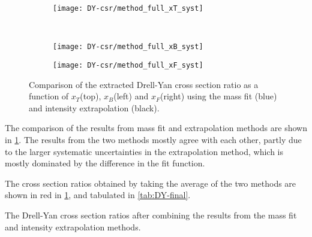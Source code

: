 \documentclass[../main.tex]{subfiles}
\begin{document}
\begin{figure}[h!]
	\centering
	\begin{subfigure}{0.6\linewidth}
		\texttt{[image: DY-csr/method\_full\_xT\_syst]}
	\end{subfigure}\\
	\begin{subfigure}{0.45\linewidth}
		\texttt{[image: DY-csr/method\_full\_xB\_syst]}
	\end{subfigure}
	\begin{subfigure}{0.45\linewidth}
		\texttt{[image: DY-csr/method\_full\_xF\_syst]}
	\end{subfigure}
	\caption{Comparison of the extracted Drell-Yan cross section ratio as a function of $x_T$(top),
		$x_B$(left) and $x_F$(right) using the mass fit (blue)  and intensity extrapolation (black).}
	\label{fig:CSR_method}
\end{figure}
The comparison of the results from mass fit and extrapolation methods are shown in \cref{fig:CSR_method}.
The results from the two methods mostly agree with each other,
partly due to the larger systematic uncertainties in the extrapolation method,
which is mostly dominated by the difference in the fit function.

The cross section ratios obtained by taking the average of the two methods are shown in red in \cref{fig:CSR_method},
and tabulated in \cref{tab:DY-final}.
\begin{table}[h!]
	\centering
	\caption{The Drell-Yan cross section ratios after combining the results from the mass fit and intensity extrapolation methods.}
	\label{tab:DY-final}
	\scalebox{0.925}{
		
	}
\end{table}

\FloatBarrier

\ifSubfilesClassLoaded{ \printbibliography[heading=bibintoc,title={References}]}{}
\end{document}
